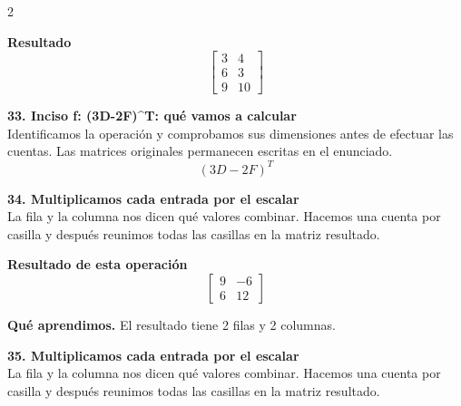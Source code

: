 \documentclass[11pt,a4paper,landscape]{article}
\begin{document}
\begin{multicols*}{2}
\begin{minipage}{\linewidth}
\par\smallskip \textbf{Resultado}\[\begin{bmatrix}3 & 4\\6 & 3\\9 & 10\end{bmatrix}\]
\end{minipage}\par\medskip
\noindent\begin{minipage}{\linewidth}\textbf{33. Inciso f: (3D-2F)\textasciicircum{}T: qué vamos a calcular}\\[2pt]Identificamos la operación y comprobamos sus dimensiones antes de efectuar las cuentas. Las matrices originales permanecen escritas en el enunciado.
\[(3D-2F)^T\]
\end{minipage}\par\medskip
\noindent\begin{minipage}{\linewidth}\textbf{34. Multiplicamos cada entrada por el escalar}\\[2pt]La fila y la columna nos dicen qué valores combinar. Hacemos una cuenta por casilla y después reunimos todas las casillas en la matriz resultado.
\par{}\par\smallskip
\par\smallskip \textbf{Resultado de esta operación}\[\begin{bmatrix}9 & -6\\6 & 12\end{bmatrix}\]
\par\smallskip\textbf{Qué aprendimos.} El resultado tiene 2 filas y 2 columnas.
\end{minipage}\par\medskip
\noindent\begin{minipage}{\linewidth}\textbf{35. Multiplicamos cada entrada por el escalar}\\[2pt]La fila y la columna nos dicen qué valores combinar. Hacemos una cuenta por casilla y después reunimos todas las casillas en la matriz resultado.

\end{minipage}
\end{multicols*}
\end{document}
